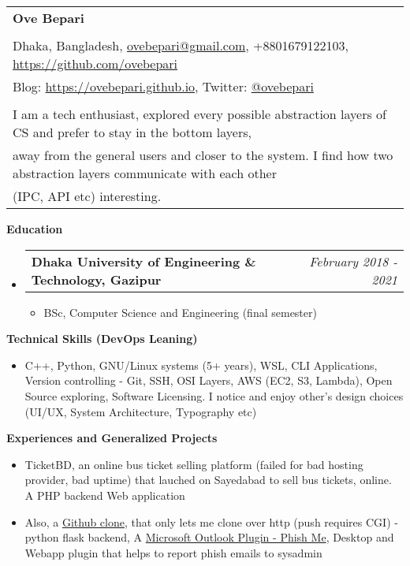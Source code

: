 \documentclass[letterpaper,10pt]{article}
\makeatletter
\newcommand{\resheading}[1]{{\large \colorbox{mygrey}{\begin{minipage}{\textwidth}{\textbf{#1 \vphantom{p\^{E}}}}\end{minipage}}}}
\newcommand{\ressubheading}[4]{
	\begin{tabular*}{7.1in}{l@{\extracolsep{\fill}}r}
		\textbf{#1} & \textit{#4} \\
	\end{tabular*}\vspace{-6pt}}
\makeatother
\begin{document}
	
	\begin{tabular*}{7.5in}{l@{\extracolsep{\fill}}}
		\textbf{\large Ove Bepari}\\
		\\
		
		Dhaka, Bangladesh, \href{mailto:ovebepari@gmail.com}{ovebepari@gmail.com}, +8801679122103, \url{https://github.com/ovebepari} \\
		 Blog: \url{https://ovebepari.github.io}, Twitter: \href{https://twitter.com/ovebepari}{@ovebepari}
		\\
		\\
		I am a tech enthusiast, explored every possible abstraction layers of CS and prefer to stay in the bottom layers, \\away from the general users and closer to the system. I find how two abstraction layers communicate with each other\\ (IPC, API etc) interesting.
	\end{tabular*}
	
	\vspace{0.3in}
	
	\resheading{Education}
	\begin{itemize}
	
		\item \ressubheading{Dhaka University of Engineering \& Technology, Gazipur}{}{}{February 2018 - 2021}
		\begin{itemize}
			\item BSc, Computer Science and Engineering (final semester)
		\end{itemize}
	
	\end{itemize}
	
	\vspace{0.2in}
	
	\resheading{Technical Skills (DevOps Leaning)}
	\begin{itemize}
		\item C++, Python, GNU/Linux systems (5+ years), WSL, CLI Applications, Version controlling - Git, SSH, OSI Layers, AWS (EC2, S3, Lambda), Open Source exploring, Software Licensing. I notice and enjoy other's design choices (UI/UX, System Architecture, Typography etc)
	\end{itemize}

	\vspace{0.2in}
	
	\resheading{Experiences and Generalized Projects}
	\begin{itemize}
		\item TicketBD, an online bus ticket selling platform (failed for bad hosting provider, bad uptime) that lauched on Sayedabad to sell bus tickets, online. A PHP backend Web application
		\item Also, a \href{https://ovebepari.github.io/linux\%7Csystems/i-made-my-own-github-not-really/}{Github clone}, that only lets me clone over http (push requires CGI) - python flask backend, A \href{https://github.com/ovebepari/PhishMe}{Microsoft Outlook Plugin - Phish Me}, Desktop and Webapp plugin that helps to report phish emails to sysadmin
	\end{itemize}
\end{document}
